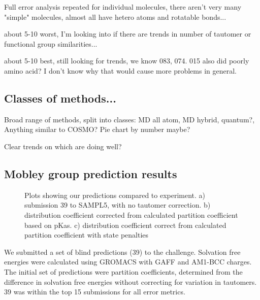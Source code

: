 Full error analysis repeated for individual molecules, there aren't very many "simple" molecules, almost all have hetero atoms and rotatable bonds...

about 5-10 worst, I'm looking into if there are trends in number of tautomer or functional group similarities...

about 5-10 best, still looking for trends, we know 083, 074. 015 also did poorly amino acid? I don't know why that would cause more problems in general. 


\subsection{Classes of methods...}
\label{results:5}
Broad range of methods, split into classes: MD all atom, MD hybrid, quantum?, Anything similar to COSMO? %
Pie chart by number maybe?

Clear trends on which are doing well? 

\subsection{Mobley group prediction results}
\label{results:6}

\begin{figure}
\caption{Plots showing our predictions compared to experiment. a) submission 39 to SAMPL5, with no tautomer correction. b) distribution coefficient corrected from calculated partition coefficient based on pKas. c) distribution coefficient correct from calculated partition coefficient with state penalties }
\label{myComparisons}       %
\end{figure}

We submitted a set of blind predictions (39) to the challenge. 
Solvation free energies were calculated using GROMACS with GAFF and AM1-BCC charges. 
The initial set of predictions were partition coefficients, determined from the difference in solvation free energies without correcting for variation in tautomers. 
39 was within the top 15 %
submissions for all error metrics.  

